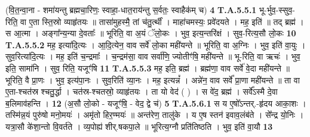 \documentclass[17pt]{extarticle}
\begin{document}
                  \newline
                                                        (वि॒त॒न्वा॒ना - शमा॑यन्तु ब्रह्मचा॒रिणः॒ स्वाहा॒-धात॒राय॑न्तु स॒र्वतः॒ स्वाहैक॑म् च) \textbf{4} \newline \newline
                                \textbf{ T.A.5.5.1} \newline
                  भू-र्भुव॒-स्सुव॒-रिति॒ वा ए॒ता स्ति॒स्रो व्याहृ॑तयः ॥  तासा॑मुहस्मै॒ तां च॑तु॒र्त्थीं । माहा॑चमस्यः॒ प्रवे॑दयते । मह॒ इति॑ ॥ तद् ब्रह्म॑ । स आ॒त्मा । अङ्गा᳚न्य॒न्या दे॒वताः᳚ ॥ भूरिति॒ वा अ॒यं ॅलो॒कः । भुव॒ इत्य॒न्तरि॑क्षं । सुव॒-रित्य॒सौ लो॒कः \textbf{ 10} \newline
                  \newline
                                                                  \textbf{ T.A.5.5.2} \newline
                  मह॒ इत्या॑दि॒त्यः । आ॒दि॒त्येन॒ वाव सर्वे॑ लो॒का मही॑यन्ते ॥ भूरिति॒ वा अ॒ग्निः । भुव॒ इति॑ वा॒युः । सुव॒रित्या॑दि॒त्यः । मह॒ इति॑ च॒न्द्रमाः᳚ । च॒न्द्रम॑सा॒ वाव सर्वा॑णि॒ ज्योतीꣳ॑षि॒ मही॑यन्ते ॥ भू-रिति॒ वा ऋचः॑ । भुव॒ इति॒ सामा॑नि ।  सुव॒ रिति॒ यजूꣳ॑षि \textbf{ 11} \newline
                  \newline
                                                                  \textbf{ T.A.5.5.3} \newline
                  मह॒ इति॒ ब्रह्म॑ । ब्रह्म॑णा॒ वाव सर्वे॑ वे॒दा मही॑यन्ते ॥ भूरिति॒ वै प्रा॒णः । भुव॒ इत्य॑पा॒नः । सुव॒रिति॑ व्या॒नः । मह॒ इत्यन्नं᳚ । अन्ने॑न॒ वाव सर्वे᳚ प्रा॒णा मही॑यन्ते ॥ ता वा ए॒ता-श्चत॑स्र श्चतु॒र्द्धा । चत॑स्र-श्चतस्रो॒ व्याहृ॑तयः । ता यो वेद॑ ( ) ।  स वे॑द॒ ब्रह्म॑ । सर्वे᳚ऽस्मै दे॒वा ब॒लिमाव॑हन्ति । \textbf{ 12} \newline
                  \newline
                                                        (अ॒सौ लो॒को - यजूꣳ॑षि॒ - वेद॒ द्वे च॑) \textbf{5} \newline \newline
                                \textbf{ T.A.5.6.1} \newline
                  स य ए॒षो᳚ऽन्तर्.-हृ॑दय आका॒शः । तस्मि॑न्न॒यं पुरु॑षो मनो॒मयः॑ । अमृ॑तो हिर॒ण्मयः॑ ॥ अन्त॑रेण॒ तालु॑के । य ए॒ष स्तन॑ इवाव॒लंब॑ते ।  से᳚न्द्र यो॒निः । यत्रा॒सौ के॑शा॒न्तो वि॒वर्त॑ते । व्य॒पोह्य॑ शीर्.षकपा॒ले ॥ भूरित्य॒ग्नौ प्रति॑तिष्ठति । भुव॒ इति॑ वा॒यौ \textbf{ 13} \newline
                  \newline
\end{document}

